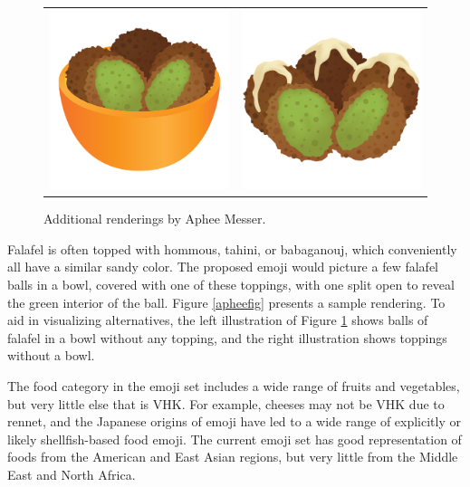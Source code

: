 \documentclass[a4paper,10pt]{article}
\begin{document}
\begin{figure}[h]
\begin{center}
\begin{tabular}{cc}
\includegraphics[width=2.2in]{falafel-bowl.png}& \includegraphics[width=2.2in]{falafel-tahini.png}
\end{tabular}
\end{center}
\caption{Additional renderings by Aphee Messer.}
\label{apheefigtwo}
\end{figure}

Falafel is often topped with hommous, tahini,
or babaganouj, which conveniently all have a similar sandy color. 
The proposed emoji would picture a few falafel balls in a bowl, covered with one of these
toppings, with one split open to reveal the green interior of the ball.  
Figure \ref{apheefig} presents
a sample rendering. 
To aid in visualizing alternatives, the left illustration
of Figure \ref{apheefigtwo} shows balls of falafel in a bowl without any topping, and the right
illustration shows toppings without a bowl.

The food category in the emoji set includes a wide range of fruits and vegetables, but
very little else that is VHK. For example, cheeses may not be VHK due to rennet, and the
Japanese origins of emoji have led to a wide range of explicitly or likely
shellfish-based food emoji. The current emoji set has good representation of foods
from the American and East Asian regions, but very little from the Middle East and
North Africa.
\end{document}

